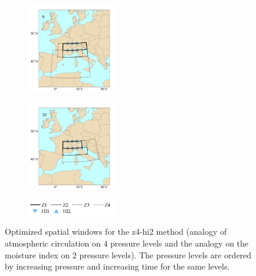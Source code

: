 \documentclass{ametsoc}
\begin{document}
\begin{figure}[htb]
\begin{subfigure}{.5\columnwidth}
		\centering
		\includegraphics[width=3.9cm]{figures/spatial_win_z4-hi2/Spatial_windows_9.png}
	\end{subfigure}%
	\begin{subfigure}{.5\columnwidth}
		\centering
		\includegraphics[width=3.9cm]{figures/spatial_win_z4-hi2/Spatial_windows_10.png}
	\end{subfigure}
	\begin{subfigure}{.5\columnwidth}
		\centering
		\includegraphics[width=3.9cm]{figures/spatial_win_z4-hi2/legend.png}
	\end{subfigure}
	\caption{Optimized spatial windows for the z4-hi2 method (analogy of atmospheric circulation on 4 pressure levels and the analogy on the moisture index on 2 pressure levels). The pressure levels are ordered by increasing pressure and increasing time for the same levels.}
	\label{fig:spatial_windows_z4-hi2}
\end{figure}
\end{document}
